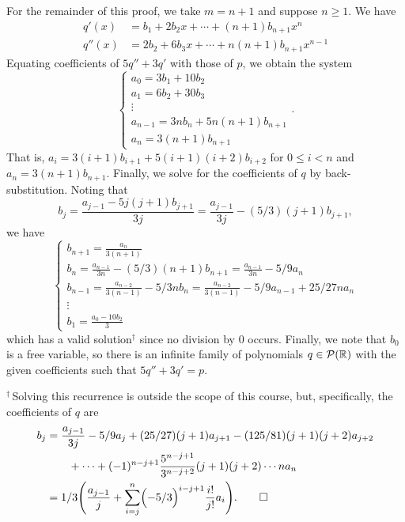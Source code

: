 \begin{exc}
\begin{solution}
For the remainder of this proof, we take $m=n+1$ and suppose $n\ge1$. We have
\begin{align*}
q'(x) &= b_1+2b_2x+\cdots+(n+1)b_{n+1}x^n\\
q''(x) &= 2b_2+6b_3x+\cdots+n(n+1)b_{n+1}x^{n-1}
\end{align*}
Equating coefficients of $5q''+3q'$ with those of $p$, we obtain the system
\[ \begin{cases}
   a_0=3b_1+10b_2\\
   a_1=6b_2+30b_3\\
   \vdots\\
   a_{n-1}=3nb_n+5n(n+1)b_{n+1}\\
   a_n=3(n+1)b_{n+1}
   \end{cases}. \]
That is, $a_i=3(i+1)b_{i+1}+5(i+1)(i+2)b_{i+2}$ for $0\le i<n$ and
$a_n=3(n+1)b_{n+1}$. Finally, we solve for the coefficients of $q$ by
back-substitution. Noting that
\[ b_j=\frac{a_{j-1}-5j(j+1)b_{j+1}}{3j}=\frac{a_{j-1}}{3j}-(5/3)(j+1)b_{j+1}, \]
we have
\[ \begin{cases}
   b_{n+1}=\frac{a_n}{3(n+1)}\\[2pt]
   b_n=\frac{a_{n-1}}{3n}-(5/3)(n+1)b_{n+1}=\frac{a_{n-1}}{3n}-5/9a_n\\[2pt]
   b_{n-1}=\frac{a_{n-2}}{3(n-1)}-5/3nb_n
     =\frac{a_{n-2}}{3(n-1)}-5/9a_{n-1}+25/27na_n\\
   \vdots\\
   b_1=\frac{a_0-10b_2}{3}
   \end{cases} \]
which has a valid solution$^\dagger$ since no division by $0$ occurs. Finally,
we note that $b_0$ is a free variable, so there is an infinite family of
polynomials $q\in\mathcal{P}(\mathbb{R})$ with the given coefficients such that
$5q''+3q'=p$.

$^\dagger$\,Solving this recurrence is outside the scope of this course, but,
specifically, the coefficients of $q$ are
\begin{align*}
b_j &= \frac{a_{j-1}}{3j}-5/9a_j+(25/27)(j+1)a_{j+1}
       -(125/81)(j+1)(j+2)a_{j+2}\\
    &\qquad+\cdots+(-1)^{n-j+1}\frac{5^{n-j+1}}{3^{n-j+2}}(j+1)(j+2)\cdots na_n\\
    &= 1/3\Biggl(\frac{a_{j-1}}{j}
       +\sum_{i=j}^n\Bigl(-5/3\Bigr)^{i-j+1}\frac{i!}{j!}a_i\Biggr).
       \qedhere
\end{align*}
\end{solution}


\end{exc}

